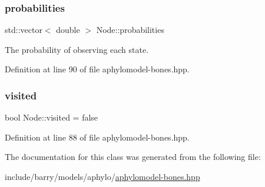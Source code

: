 \subsubsection{\texorpdfstring{probabilities}{probabilities}}
{\footnotesize\ttfamily std\+::vector$<$ double $>$ Node\+::probabilities}



The probability of observing each state. 



Definition at line 90 of file aphylomodel-\/bones.\+hpp.

\mbox{\label{class_node_aa1bdec4e775fc578632e6a2dced9e251}} 
\subsubsection{\texorpdfstring{visited}{visited}}
{\footnotesize\ttfamily bool Node\+::visited = false}



Definition at line 88 of file aphylomodel-\/bones.\+hpp.



The documentation for this class was generated from the following file\+:\begin{DoxyCompactItemize}
\item 
include/barry/models/aphylo/\hyperlink{aphylomodel-bones_8hpp}{aphylomodel-\/bones.\+hpp}\end{DoxyCompactItemize}

